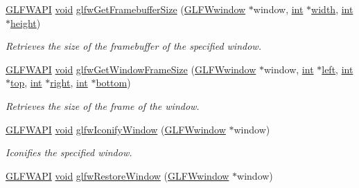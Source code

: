 \begin{DoxyCompactItemize}
\hyperlink{glfw3_8h_a56da5036b2cc259351ae22fd6439bb47}{G\+L\+F\+W\+A\+P\+I} \hyperlink{wglew_8h_aeea6e3dfae3acf232096f57d2d57f084}{void} \hyperlink{group__window_gaf7d17f3534b4b6dc9a6f905e3a240b7e}{glfw\+Get\+Framebuffer\+Size} (\hyperlink{group__window_ga3c96d80d363e67d13a41b5d1821f3242}{G\+L\+F\+Wwindow} $\ast$window, \hyperlink{wglew_8h_a500a82aecba06f4550f6849b8099ca21}{int} $\ast$\hyperlink{glew_8h_aa105b18f96e6bc2485cb7f576a7fb9ba}{width}, \hyperlink{wglew_8h_a500a82aecba06f4550f6849b8099ca21}{int} $\ast$\hyperlink{glew_8h_aa214bd63e12f7ddf524c83894fcc69a7}{height})
\begin{DoxyCompactList}\small\item\em Retrieves the size of the framebuffer of the specified window. \end{DoxyCompactList}\item 
\hyperlink{glfw3_8h_a56da5036b2cc259351ae22fd6439bb47}{G\+L\+F\+W\+A\+P\+I} \hyperlink{wglew_8h_aeea6e3dfae3acf232096f57d2d57f084}{void} \hyperlink{group__window_gaad46cdaae2eb732f68d3a1499a7c5409}{glfw\+Get\+Window\+Frame\+Size} (\hyperlink{group__window_ga3c96d80d363e67d13a41b5d1821f3242}{G\+L\+F\+Wwindow} $\ast$window, \hyperlink{wglew_8h_a500a82aecba06f4550f6849b8099ca21}{int} $\ast$\hyperlink{glew_8h_a6358510bdde486b81c7951ee5c470ee4}{left}, \hyperlink{wglew_8h_a500a82aecba06f4550f6849b8099ca21}{int} $\ast$\hyperlink{glew_8h_a2d9dcbd99961f3384f2c4d57014e0c38}{top}, \hyperlink{wglew_8h_a500a82aecba06f4550f6849b8099ca21}{int} $\ast$\hyperlink{glew_8h_a18826d74cd7b4e758c25b4ba66e20be2}{right}, \hyperlink{wglew_8h_a500a82aecba06f4550f6849b8099ca21}{int} $\ast$\hyperlink{glew_8h_a111675ec0799cd2ffecf18fd6c4ba449}{bottom})
\begin{DoxyCompactList}\small\item\em Retrieves the size of the frame of the window. \end{DoxyCompactList}\item 
\hyperlink{glfw3_8h_a56da5036b2cc259351ae22fd6439bb47}{G\+L\+F\+W\+A\+P\+I} \hyperlink{wglew_8h_aeea6e3dfae3acf232096f57d2d57f084}{void} \hyperlink{group__window_ga24274e3c6ecd44e11fec5e6b66e4d7f3}{glfw\+Iconify\+Window} (\hyperlink{group__window_ga3c96d80d363e67d13a41b5d1821f3242}{G\+L\+F\+Wwindow} $\ast$window)
\begin{DoxyCompactList}\small\item\em Iconifies the specified window. \end{DoxyCompactList}\item 
\hyperlink{glfw3_8h_a56da5036b2cc259351ae22fd6439bb47}{G\+L\+F\+W\+A\+P\+I} \hyperlink{wglew_8h_aeea6e3dfae3acf232096f57d2d57f084}{void} \hyperlink{group__window_ga1e29caf0b819f578b04db52fff17256c}{glfw\+Restore\+Window} (\hyperlink{group__window_ga3c96d80d363e67d13a41b5d1821f3242}{G\+L\+F\+Wwindow} $\ast$window)

\end{DoxyCompactItemize}
